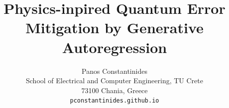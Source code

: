 \documentclass[10pt,twocolumn,letterpaper]{article}
\title{Physics-inpired Quantum Error Mitigation by Generative Autoregression}
\author{Panos Constantinides\\
School of Electrical and Computer Engineering, TU Crete\\
73100 Chania, Greece\\
{\tt\small pconstantinides.github.io}
}
\begin{document}
\maketitle
    





{
    \small
    
    
}

\end{document}
